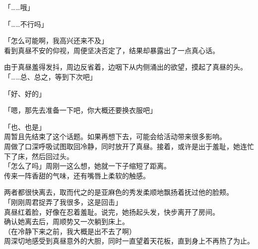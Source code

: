 「……哦」

「……不行吗」

「怎么可能啊，我高兴还来不及」\\

看到真昼不安的仰视，周便坚决否定了，结果却暴露出了一点真心话。

由于真昼羞得发抖，周边反省着，边咽下从内侧涌出的欲望，摸起了真昼的头。\\

「……总、总之，等到下次吧」

「好、好的」

「嗯，那先去准备一下吧，你大概还要换衣服吧」

「也、也是」\\

周暂且先结束了这个话题。如果再想下去，可能会给活动带来很多影响。\\

周做了口深呼吸试图取回冷静，同时放开了真昼。接着，或许是出于羞耻，她连忙下了床，然后回过头。\\

「怎么了吗」周刚一这么想，她就一下子缩短了距离。\\

传来一阵香甜的气味，还有嘴唇上柔软的触感。

两者都很快离去，取而代之的是亚麻色的秀发柔顺地飘扬着抚过他的脸颊。\\

「刚刚周君捉弄了我很多，这是回击」\\

真昼红着脸，好像在忍着羞耻。说完，她扬起头发，快步离开了房间。\\

确认她离去后，周顺势又一次躺到床上。\\

（在冷静下来之前，我大概是出不去了啊）\\

周深切地感受到真昼意外的大胆，同时一直望着天花板，直到身上不再热了为止。

